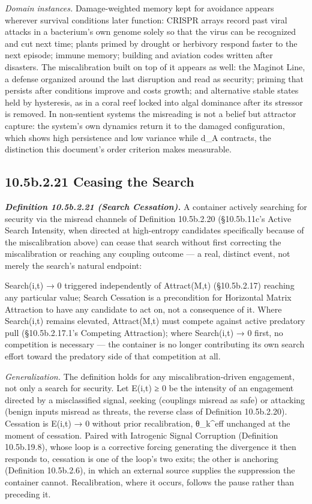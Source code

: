 \documentclass[
]{article}
\begin{document}
\emph{Domain instances.} Damage-weighted memory kept for avoidance
appears wherever survival conditions later function: CRISPR arrays
record past viral attacks in a bacterium's own genome solely so that the
virus can be recognized and cut next time; plants primed by drought or
herbivory respond faster to the next episode; immune memory; building
and aviation codes written after disasters. The miscalibration built on
top of it appears as well: the Maginot Line, a defense organized around
the last disruption and read as security; priming that persists after
conditions improve and costs growth; and alternative stable states held
by hysteresis, as in a coral reef locked into algal dominance after its
stressor is removed. In non-sentient systems the misreading is not a
belief but attractor capture: the system's own dynamics return it to the
damaged configuration, which shows high persistence and low variance
while d\_A contracts, the distinction this document's order criterion
makes measurable.

\hypertarget{b.2.21-ceasing-the-search}{%
\subsection{10.5b.2.21 Ceasing the
Search}\label{b.2.21-ceasing-the-search}}

\emph{\textbf{Definition 10.5b.2.21 (Search Cessation).}} A container
actively searching for security via the misread channels of Definition
10.5b.2.20 (§10.5b.11c's Active Search Intensity, when directed at
high-entropy candidates specifically because of the miscalibration
above) can cease that search without first correcting the miscalibration
or reaching any coupling outcome --- a real, distinct event, not merely
the search's natural endpoint:

Search(i,t) → 0 triggered independently of Attract(M,t) (§10.5b.2.17)
reaching any particular value; Search Cessation is a precondition for
Horizontal Matrix Attraction to have any candidate to act on, not a
consequence of it. Where Search(i,t) remains elevated, Attract(M,t) must
compete against active predatory pull (§10.5b.2.17.1's Competing
Attraction); where Search(i,t) → 0 first, no competition is necessary
--- the container is no longer contributing its own search effort toward
the predatory side of that competition at all.

\emph{Generalization.} The definition holds for any
miscalibration-driven engagement, not only a search for security. Let
E(i,t) ≥ 0 be the intensity of an engagement directed by a misclassified
signal, seeking (couplings misread as safe) or attacking (benign inputs
misread as threats, the reverse class of Definition 10.5b.2.20).
Cessation is E(i,t) → 0 without prior recalibration, θ\_k\^{}eff
unchanged at the moment of cessation. Paired with Iatrogenic Signal
Corruption (Definition 10.5b.19.8), whose loop is a corrective forcing
generating the divergence it then responds to, cessation is one of the
loop's two exits; the other is anchoring (Definition 10.5b.2.6), in
which an external source supplies the suppression the container cannot.
Recalibration, where it occurs, follows the pause rather than preceding
it.
\end{document}
